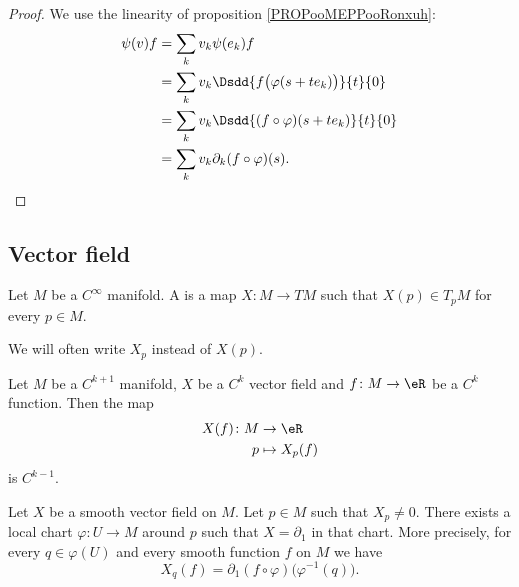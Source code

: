 \begin{proof}
	We use the linearity of proposition \ref{PROPooMEPPooRonxuh}:
	\begin{subequations}
		\begin{align}
			\psi(v)f & =\sum_kv_k\psi(e_k)f                                  \\
			         & =\sum_kv_k\Dsdd{ f\big( \varphi(s+te_k) \big) }{t}{0} \\
			         & =\sum_kv_k\Dsdd{ (f\circ\varphi)(s+te_k) }{t}{0}      \\
			         & =\sum_kv_k\partial_k(f\circ\varphi)(s).
		\end{align}
	\end{subequations}
\end{proof}


\subsection{Vector field}

\begin{definition}        \label{DEFooAATTooLhNqDb}
	Let \( M\) be a \(  C^{\infty}\) manifold. A  is a map \( X\colon M\to TM\) such that \( X(p)\in T_pM\) for every \( p\in M\).

	We will often write \( X_p\) instead of \( X(p)\).
\end{definition}

\begin{proposition}         \label{PROPooGYWRooPIyocN}
	Let \( M\) be a \( C^{k+1}\) manifold, \( X\) be a \( C^k\) vector field and \( f\colon M \to \eR\) be a \( C^k\) function. Then the map
	\begin{equation}
		\begin{aligned}
			X(f)\colon M & \to \eR        \\
			p            & \mapsto X_p(f)
		\end{aligned}
	\end{equation}
	is \( C^{k-1}\).
\end{proposition}

\begin{lemma}       \label{LEMooLNIAooCmbLQp}
	Let \( X\) be a smooth vector field on \( M\). Let \( p\in M\) such that \( X_p\neq 0\). There exists a local chart \( \varphi\colon U\to M\) around \( p\) such that \( X=\partial_1\) in that chart. More precisely, for every \( q\in \varphi(U)\) and every smooth function \( f\) on \( M\) we have
	\begin{equation}
		X_q(f)=\partial_1(f\circ \varphi)\big( \varphi^{-1}(q) \big).
	\end{equation}
\end{lemma}


